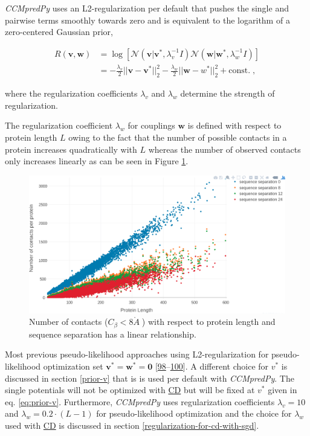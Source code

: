 \documentclass[11pt,a4paper,twoside]{book}
\newcommand{\Cb}{C_\beta}
\newcommand{\eq}{\!=\!}
\renewcommand{\v}{\mathbf{v}}
\newcommand{\w}{\mathbf{w}}
\newcommand{\angstrom}{\mathring{A} \;}
\theoremstyle{definition}
\theoremstyle{definition}
\theoremstyle{remark}
\begin{document}
\emph{CCMpredPy} uses an L2-regularization per default that pushes the
single and pairwise terms smoothly towards zero and is equivalent to the
logarithm of a zero-centered Gaussian prior,

\begin{align}
  R(\v, \w)  &= \log \left[ \mathcal{N}(\v | \v^*, \lambda_v^{-1} I) \mathcal{N}(\w | \w^*, \lambda_w^{-1} I) \right] \nonumber \\
             &= -\frac{\lambda_v}{2} ||\v-\v^*||_2^2 - \frac{\lambda_w}{2} ||\w-w^*||_2^2 + \text{const.} \; ,
\label{eq:l2-reg}
\end{align}

where the regularization coefficients \(\lambda_v\) and \(\lambda_w\)
determine the strength of regularization.

The regularization coefficient \(\lambda_w\) for couplings \(\w\) is
defined with respect to protein length \(L\) owing to the fact that the
number of possible contacts in a protein increases quadratically with
\(L\) whereas the number of observed contacts only increases linearly as
can be seen in Figure \ref{fig:number-contacts-against-L}.





\begin{figure}

{\centering \includegraphics[width=0.9\linewidth]{img/full_likelihood/no_contacts_vs_protein_length_thr8} 

}

\caption{Number of contacts
(\(\Cb < 8 \angstrom\)) with respect to protein length and sequence
separation has a linear relationship.}\label{fig:number-contacts-against-L}
\end{figure}

Most previous pseudo-likelihood approaches using L2-regularization for
pseudo-likelihood optimization set \(\v^* \eq \w^* \eq \mathbf{0}\)
{[}\protect\hyperlink{ref-Seemayer2014}{98}--\protect\hyperlink{ref-Kamisetty2013}{100}{]}.
A different choice for \(v^*\) is discussed in section \ref{prior-v}
that is is used per default with \emph{CCMpredPy}. The single potentials
will not be optimized with \protect\hyperlink{abbrev}{CD} but will be
fixed at \(v^*\) given in eq. \eqref{eq:prior-v}. Furthermore,
\emph{CCMpredPy} uses regularization coefficients \(\lambda_v \eq 10\)
and \(\lambda_w \eq 0.2\cdot(L-1)\) for pseudo-likelihood optimization
and the choice for \(\lambda_w\) used with
\protect\hyperlink{abbrev}{CD} is discussed in section
\ref{regularization-for-cd-with-sgd}.
\end{document}

